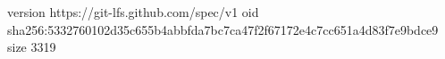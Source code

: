 version https://git-lfs.github.com/spec/v1
oid sha256:5332760102d35c655b4abbfda7bc7ca47f2f67172e4c7cc651a4d83f7e9bdce9
size 3319
